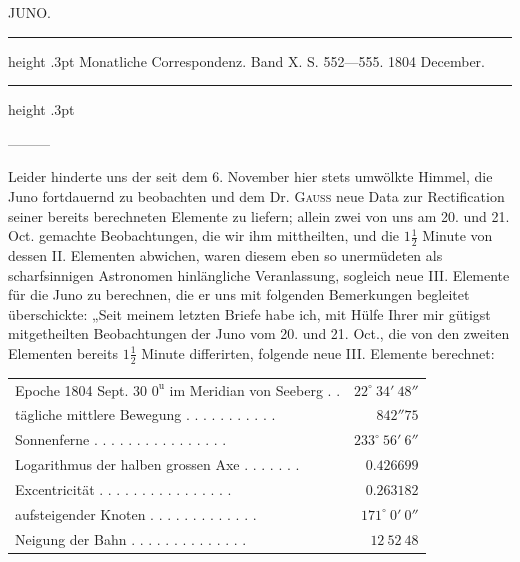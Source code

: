 \par\bigskip
{}
\hypertarget{native-263-lower}{}
\begin{center}
\large JUNO.
\end{center}

\begin{center}
\parbox{.78\linewidth}{%
\centering\fontsize{8.2}{10.2}\selectfont
\hrule height .3pt\relax\vspace{2.5pt}
Monatliche Correspondenz. Band X. S. 552—555. 1804 December.\par
\vspace{2.5pt}\hrule height .3pt\relax
}
\end{center}

\par\indent —\quad—\quad—\par
\par\indent Leider hinderte uns der seit dem 6. November hier stets umwölkte Himmel, die Juno fortdauernd
zu beobachten und dem Dr. \textsc{Gauss} neue Data zur Rectification seiner bereits berechneten Elemente zu
liefern; allein zwei von uns am 20. und 21. Oct. gemachte Beobachtungen, die wir ihm mittheilten, und
die $1\frac{1}{2}$ Minute von dessen II. Elementen abwichen, waren diesem eben so unermüdeten als scharfsinnigen Astronomen hinlängliche Veranlassung, sogleich neue III. Elemente für die Juno zu berechnen, die
er uns mit folgenden Bemerkungen begleitet überschickte: „Seit meinem letzten Briefe habe ich, mit
Hülfe Ihrer mir gütigst mitgetheilten Beobachtungen der Juno vom 20. und 21. Oct., die von den zweiten Elementen bereits $1\frac{1}{2}$ Minute differirten, folgende neue III. Elemente berechnet:

\begin{center}
\begingroup\fontsize{8}{10}\selectfont\setlength{\tabcolsep}{3pt}\renewcommand{\arraystretch}{1.1}
\begin{tabular}{lr}
Epoche 1804 Sept. 30 $0^{\mathrm u}$ im Meridian von Seeberg . . & $22^\circ\ 34'\ 48''$ \\
tägliche mittlere Bewegung . . . . . . . . . . . & $842''75$ \\
Sonnenferne . . . . . . . . . . . . . . . . & $233^\circ\ 56'\ 6''$ \\
Logarithmus der halben grossen Axe . . . . . . . & $0.426699$ \\
Excentricität . . . . . . . . . . . . . . . . & $0.263182$ \\
aufsteigender Knoten . . . . . . . . . . . . . & $171^\circ\ 0'\ 0''$ \\
Neigung der Bahn . . . . . . . . . . . . . . & $12\ 52\ 48$ \\
\end{tabular}\endgroup
\end{center}

